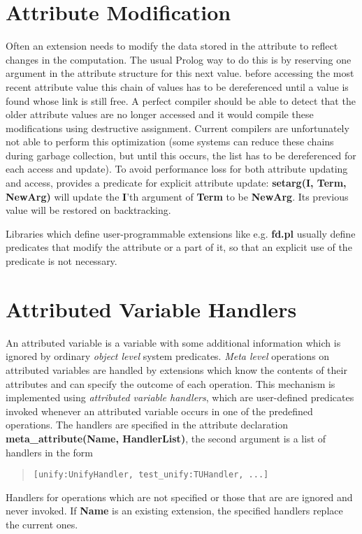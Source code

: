 \section{Attribute Modification}
Often an extension needs to modify the data stored in the
attribute to reflect changes in the computation.
The usual Prolog way to do this is by reserving
one argument in the attribute structure for this next value.
before accessing the most recent attribute value this chain
of values has to be dereferenced until a value is found whose
link is still free.
A perfect compiler should be able to detect that the older
attribute values are no longer accessed and it would compile
these modifications using destructive assignment.
Current compilers are unfortunately not able to perform
this optimization (some systems can reduce these chains
during garbage collection, but until this occurs,
the list has to be dereferenced for each access and update).
To avoid performance loss for both attribute updating and
access, {\eclipse} provides a predicate for explicit
attribute update: 
{\bf setarg(I, Term, NewArg)} will update the {\bf I}'th
argument of {\bf Term} to be {\bf NewArg}.
Its previous value will be restored on backtracking.

Libraries which define user-programmable extensions
like e.g. {\bf fd.pl} usually define predicates that
modify the attribute or a part of it, so that an explicit
use of the  predicate is not necessary.

\section{Attributed Variable Handlers}
\label{metahandlers}
An attributed variable is a variable with some additional information
which is ignored by ordinary {\it object level} system predicates.
{\it Meta level} operations on attributed variables are handled by
extensions which know
the contents of their attributes and can specify the outcome
of each operation.
This mechanism is implemented using {\it attributed variable handlers},
which are user-defined predicates invoked
whenever an attributed variable occurs in one of the predefined
operations.
The handlers are specified in the attribute declaration
{\bf meta_attribute(Name, HandlerList)}, the second argument
is a list of handlers in the form
\begin{quote}
\begin{verbatim}
[unify:UnifyHandler, test_unify:TUHandler, ...]
\end{verbatim}
\end{quote}
Handlers for operations which are not specified or those that are
 are ignored and never invoked.
If {\bf Name} is an existing extension, the specified handlers
replace the current ones.

